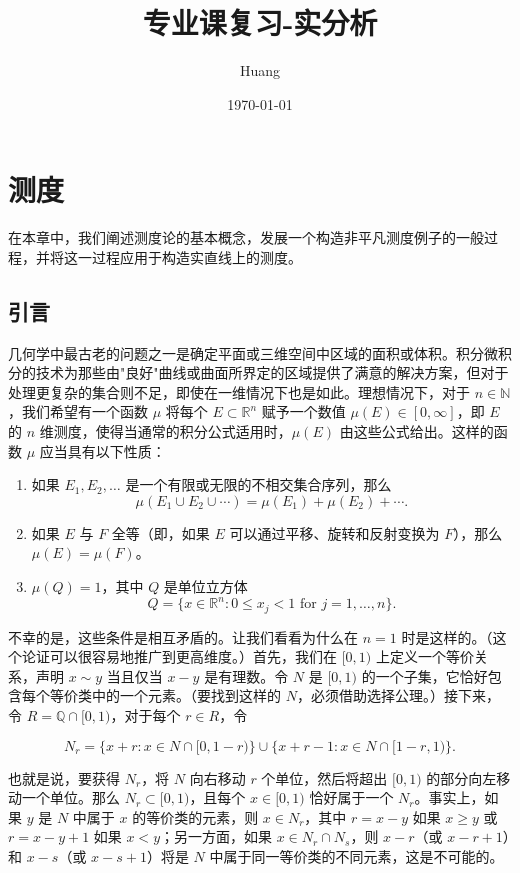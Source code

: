 \documentclass[lang=cn,10pt,thmcnt=section]{elegantbook}
\title{专业课复习-实分析}
\author{Huang}
\date{\today}
\begin{document}
	
	\maketitle
	\frontmatter
	
	\tableofcontents
	
	\mainmatter

\chapter{测度}
在本章中，我们阐述测度论的基本概念，发展一个构造非平凡测度例子的一般过程，并将这一过程应用于构造实直线上的测度。

\section{引言}
几何学中最古老的问题之一是确定平面或三维空间中区域的面积或体积。积分微积分的技术为那些由"良好"曲线或曲面所界定的区域提供了满意的解决方案，但对于处理更复杂的集合则不足，即使在一维情况下也是如此。理想情况下，对于 $n \in \mathbb{N}$，我们希望有一个函数 $\mu$ 将每个 $E \subset \mathbb{R}^n$ 赋予一个数值 $\mu(E) \in [0,\infty]$，即 $E$ 的 $n$ 维测度，使得当通常的积分公式适用时，$\mu(E)$ 由这些公式给出。这样的函数 $\mu$ 应当具有以下性质：

\begin{enumerate}[label=\roman*.]
\item 如果 $E_1, E_2, \ldots$ 是一个有限或无限的不相交集合序列，那么
\[\mu(E_1 \cup E_2 \cup \cdots) = \mu(E_1) + \mu(E_2) + \cdots.\]

\item 如果 $E$ 与 $F$ 全等（即，如果 $E$ 可以通过平移、旋转和反射变换为 $F$），那么 $\mu(E) = \mu(F)$。

\item $\mu(Q) = 1$，其中 $Q$ 是单位立方体
\[Q = \{x \in \mathbb{R}^n : 0 \leq x_j < 1 \text{ for } j = 1, \ldots, n\}.\]
\end{enumerate}

不幸的是，这些条件是相互矛盾的。让我们看看为什么在 $n = 1$ 时是这样的。（这个论证可以很容易地推广到更高维度。）首先，我们在 $[0, 1)$ 上定义一个等价关系，声明 $x \sim y$ 当且仅当 $x - y$ 是有理数。令 $N$ 是 $[0, 1)$ 的一个子集，它恰好包含每个等价类中的一个元素。（要找到这样的 $N$，必须借助选择公理。）接下来，令 $R = \mathbb{Q} \cap [0, 1)$，对于每个 $r \in R$，令

\[N_r = \{x + r : x \in N \cap [0, 1-r)\} \cup \{x + r - 1 : x \in N \cap [1-r, 1)\}.\]

也就是说，要获得 $N_r$，将 $N$ 向右移动 $r$ 个单位，然后将超出 $[0, 1)$ 的部分向左移动一个单位。那么 $N_r \subset [0, 1)$，且每个 $x \in [0, 1)$ 恰好属于一个 $N_r$。事实上，如果 $y$ 是 $N$ 中属于 $x$ 的等价类的元素，则 $x \in N_r$，其中 $r = x - y$ 如果 $x \geq y$ 或 $r = x - y + 1$ 如果 $x < y$；另一方面，如果 $x \in N_r \cap N_s$，则 $x - r$（或 $x - r + 1$）和 $x - s$（或 $x - s + 1$）将是 $N$ 中属于同一等价类的不同元素，这是不可能的。
\end{document}
